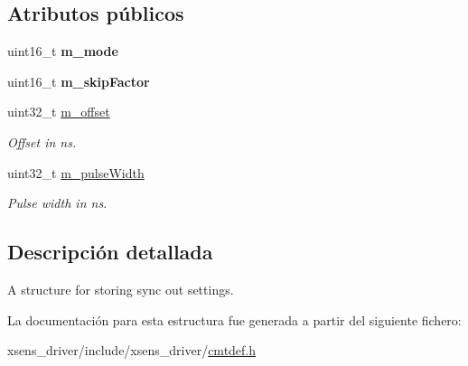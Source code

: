 \subsection*{\-Atributos públicos}
\begin{DoxyCompactItemize}
\item 
\hypertarget{structCmtSyncOutSettings_a9738d7fe5c0db97b6e6c8f2b9786237c}{uint16\-\_\-t {\bfseries m\-\_\-mode}}\label{structCmtSyncOutSettings_a9738d7fe5c0db97b6e6c8f2b9786237c}

\item 
\hypertarget{structCmtSyncOutSettings_aaa29bb19c8d94cb23ad1982daeff2d49}{uint16\-\_\-t {\bfseries m\-\_\-skip\-Factor}}\label{structCmtSyncOutSettings_aaa29bb19c8d94cb23ad1982daeff2d49}

\item 
\hypertarget{structCmtSyncOutSettings_a1c3063922df601ed387d7124d58c723f}{uint32\-\_\-t \hyperlink{structCmtSyncOutSettings_a1c3063922df601ed387d7124d58c723f}{m\-\_\-offset}}\label{structCmtSyncOutSettings_a1c3063922df601ed387d7124d58c723f}

\begin{DoxyCompactList}\small\item\em \-Offset in ns. \end{DoxyCompactList}\item 
\hypertarget{structCmtSyncOutSettings_a0f122e9f0a106cc1a7236bdc42903c6a}{uint32\-\_\-t \hyperlink{structCmtSyncOutSettings_a0f122e9f0a106cc1a7236bdc42903c6a}{m\-\_\-pulse\-Width}}\label{structCmtSyncOutSettings_a0f122e9f0a106cc1a7236bdc42903c6a}

\begin{DoxyCompactList}\small\item\em \-Pulse width in ns. \end{DoxyCompactList}\end{DoxyCompactItemize}


\subsection{\-Descripción detallada}
\-A structure for storing sync out settings. 

\-La documentación para esta estructura fue generada a partir del siguiente fichero\-:\begin{DoxyCompactItemize}
\item 
xsens\-\_\-driver/include/xsens\-\_\-driver/\hyperlink{cmtdef_8h}{cmtdef.\-h}\end{DoxyCompactItemize}

